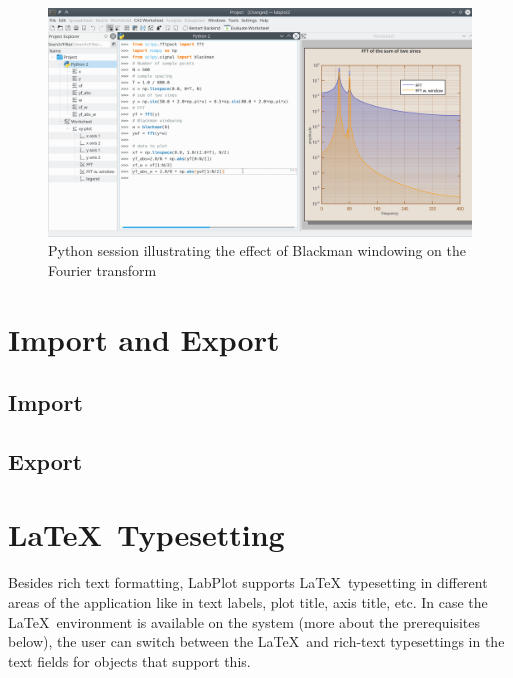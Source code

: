 \begin{figure}
\includegraphics[width=\textwidth]{images/python_session.png}
\caption{Python session illustrating the effect of Blackman windowing on the Fourier transform}
\end{figure}



\chapter{Import and Export}\label{ch:import_export}
\section{Import}\label{sec:import}
\section{Export}\label{sec:export}

\chapter{\LaTeX\, Typesetting}\label{ch:latex_typesetting}
Besides rich text formatting, LabPlot supports \LaTeX\, typesetting in different areas of the application like in text labels, plot title, axis title, etc. In case the \LaTeX\, environment is available on the system (more about the prerequisites below), the user can switch between the \LaTeX\, and rich-text typesettings in the text fields for objects that support this.


